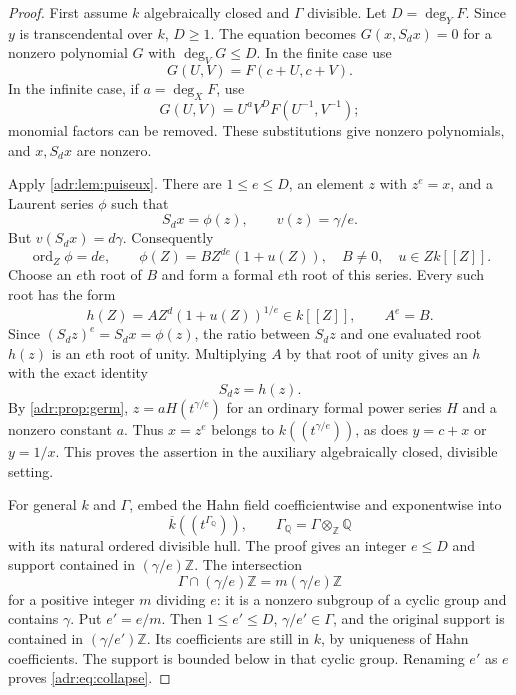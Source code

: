 \documentclass[11pt,letterpaper]{article}
\numberwithin{equation}{section}
\theoremstyle{definition}
\theoremstyle{remark}
\newcommand{\Q}{\mathbb Q}
\newcommand{\Z}{\mathbb Z}
\newcommand{\ord}{\operatorname{ord}}
\begin{document}
\begin{proof}
First assume $k$ algebraically closed and $\Gamma$ divisible. Let
$D=\deg_YF$. Since $y$ is transcendental over $k$, $D\ge1$.
The equation becomes $G(x,S_dx)=0$ for a nonzero polynomial $G$ with
$\deg_VG\le D$. In the finite case use
\[
 G(U,V)=F(c+U,c+V).
\]
In the infinite case, if $a=\deg_XF$, use
\[
 G(U,V)=U^aV^D F(U^{-1},V^{-1});
\]
monomial factors can be removed. These substitutions give nonzero
polynomials, and $x,S_dx$ are nonzero.

Apply \cref{adr:lem:puiseux}. There are $1\le e\le D$, an element $z$ with
$z^e=x$, and a Laurent series $\phi$ such that
\begin{equation}\label{adr:eq:mainbranch}
 S_dx=\phi(z),\qquad v(z)=\gamma/e.
\end{equation}
But $v(S_dx)=d\gamma$. Consequently
\[
 \ord_Z\phi=de,
 \qquad \phi(Z)=B Z^{de}(1+u(Z)),
 \quad B\ne0,\quad u\in Zk[[Z]].
\]
Choose an $e$th root of $B$ and form a formal $e$th root of this series.
Every such root has the form
\[
 h(Z)=A Z^d(1+u(Z))^{1/e}\in k[[Z]],\qquad A^e=B.
\]
Since $(S_dz)^e=S_dx=\phi(z)$, the ratio between $S_dz$ and one evaluated
root $h(z)$ is an $e$th root of unity. Multiplying $A$ by that root of
unity gives an $h$ with the exact identity
\begin{equation}\label{adr:eq:z-germ}
 S_dz=h(z).
\end{equation}
By \cref{adr:prop:germ},
$z=aH(t^{\gamma/e})$ for an ordinary formal power series $H$ and a
nonzero constant $a$. Thus $x=z^e$ belongs to
$k((t^{\gamma/e}))$, as does $y=c+x$ or $y=1/x$. This proves the
assertion in the auxiliary algebraically closed, divisible setting.

For general $k$ and $\Gamma$, embed the Hahn field coefficientwise and
exponentwise into
\[
 \overline{k}((t^{\Gamma_{\Q}})),
 \qquad \Gamma_{\Q}=\Gamma\otimes_{\Z}\Q
\]
with its natural ordered divisible hull. The proof gives an integer
$e\le D$ and support contained in $(\gamma/e)\Z$. The intersection
\[
 \Gamma\cap(\gamma/e)\Z=m(\gamma/e)\Z
\]
for a positive integer $m$ dividing $e$: it is a nonzero subgroup of a
cyclic group and contains $\gamma$. Put $e'=e/m$. Then
$1\le e'\le D$, $\gamma/e'\in\Gamma$, and the original support is
contained in $(\gamma/e')\Z$. Its coefficients are still in $k$, by
uniqueness of Hahn coefficients. The support is bounded below in that
cyclic group. Renaming $e'$ as $e$ proves \eqref{adr:eq:collapse}.
\end{proof}
\end{document}
